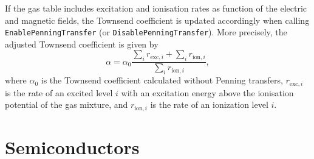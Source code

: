 If the gas table includes excitation and ionisation rates as function 
of the electric and magnetic fields, the Townsend coefficient is updated 
accordingly when calling \texttt{EnablePenningTransfer} 
(or \texttt{DisablePenningTransfer}). More precisely,  
the adjusted Townsend coefficient is given by
\begin{equation*}
  \alpha = \alpha_{0} \frac{\sum_{i} r_{\text{exc}, i} + \sum_{i} r_{\text{ion}, i}}{\sum_{i} r_{\text{ion}, i}},
\end{equation*}
where $\alpha_{0}$ is the Townsend coefficient calculated without Penning 
transfers,
$r_{\text{exc}, i}$ is the rate of an excited level $i$ with an excitation 
energy above the ionisation potential of the gas mixture, and 
$r_{\text{ion}, i}$ is the rate of an ionization level $i$.

\section{Semiconductors}
